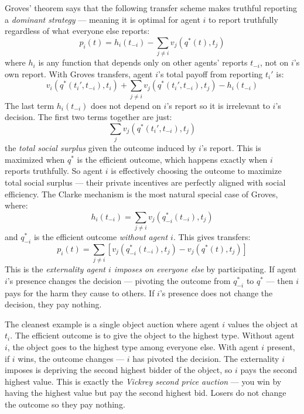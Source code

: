 \documentclass[11pt,english]{article}
\begin{document}
Groves' theorem says that the following transfer scheme makes truthful reporting a \textit{dominant strategy} --- meaning it is optimal for agent $i$ to report truthfully regardless of what everyone else reports:
\begin{equation}
    p_i(t) = h_i(t_{-i}) - \sum_{j \neq i} v_j(q^*(t), t_j)
\end{equation}
where $h_i$ is any function that depends only on other agents' reports $t_{-i}$, not on $i$'s own report. With Groves transfers, agent $i$'s total payoff from reporting $t_i'$ is:
\begin{equation}
    v_i(q^*(t_i', t_{-i}), t_i) + \sum_{j \neq i} v_j(q^*(t_i', t_{-i}), t_j) - h_i(t_{-i})
\end{equation}
The last term $h_i(t_{-i})$ does not depend on $i$'s report so it is irrelevant to $i$'s decision. The first two terms together are just:
\begin{equation}
    \sum_j v_j(q^*(t_i', t_{-i}), t_j)
\end{equation}
the \textit{total social surplus} given the outcome induced by $i$'s report. This is maximized when $q^*$ is the efficient outcome, which happens exactly when $i$ reports truthfully. So agent $i$ is effectively choosing the outcome to maximize total social surplus --- their private incentives are perfectly aligned with social efficiency. The Clarke mechanism is the most natural special case of Groves, where:
\begin{equation}
    h_i(t_{-i}) = \sum_{j \neq i} v_j(q^*_{-i}(t_{-i}), t_j)
\end{equation}
and $q^*_{-i}$ is the efficient outcome \textit{without agent $i$}. This gives transfers:
\begin{equation}
    p_i(t) = \sum_{j \neq i}\left[v_j(q^*_{-i}(t_{-i}), t_j) - v_j(q^*(t), t_j)\right]
\end{equation}
This is the \textit{externality agent $i$ imposes on everyone else} by participating. If agent $i$'s presence changes the decision --- pivoting the outcome from $q^*_{-i}$ to $q^*$ --- then $i$ pays for the harm they cause to others. If $i$'s presence does not change the decision, they pay nothing.

The cleanest example is a single object auction where agent $i$ values the object at $t_i$. The efficient outcome is to give the object to the highest type. Without agent $i$, the object goes to the highest type among everyone else. With agent $i$ present, if $i$ wins, the outcome changes --- $i$ has pivoted the decision. The externality $i$ imposes is depriving the second highest bidder of the object, so $i$ pays the second highest value. This is exactly the \textit{Vickrey second price auction} --- you win by having the highest value but pay the second highest bid. Losers do not change the outcome so they pay nothing.
\end{document}
